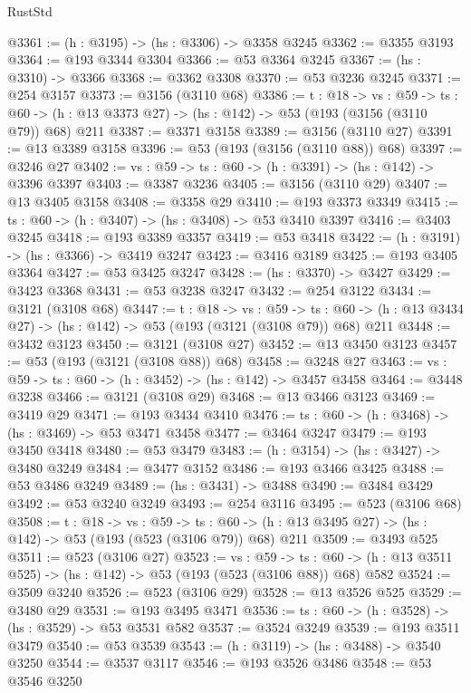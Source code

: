 \begin{lexlean}{RustStd}
\begin{coremodule}
@3361 := (h : @3195) -> (hs : @3306) -> @3358 @3245
@3362 := @3355 @3193
@3364 := @193 @3344 @3304
@3366 := @53 @3364 @3245
@3367 := (hs : @3310) -> @3366
@3368 := @3362 @3308
@3370 := @53 @3236 @3245
@3371 := @254 @3157
@3373 := @3156 (@3110 @68)
@3386 := {t : @18} ->
  {vs : @59} ->
  {ts : @60} -> (h : @13 @3373 @27) -> (hs : @142) -> @53 (@193 (@3156 (@3110 @79)) @68) @211
@3387 := @3371 @3158
@3389 := @3156 (@3110 @27)
@3391 := @13 @3389 @3158
@3396 := @53 (@193 (@3156 (@3110 @88)) @68)
@3397 := @3246 @27
@3402 := {vs : @59} -> {ts : @60} -> (h : @3391) -> (hs : @142) -> @3396 @3397
@3403 := @3387 @3236
@3405 := @3156 (@3110 @29)
@3407 := @13 @3405 @3158
@3408 := @3358 @29
@3410 := @193 @3373 @3349
@3415 := {ts : @60} -> (h : @3407) -> (hs : @3408) -> @53 @3410 @3397
@3416 := @3403 @3245
@3418 := @193 @3389 @3357
@3419 := @53 @3418
@3422 := (h : @3191) -> (hs : @3366) -> @3419 @3247
@3423 := @3416 @3189
@3425 := @193 @3405 @3364
@3427 := @53 @3425 @3247
@3428 := (hs : @3370) -> @3427
@3429 := @3423 @3368
@3431 := @53 @3238 @3247
@3432 := @254 @3122
@3434 := @3121 (@3108 @68)
@3447 := {t : @18} ->
  {vs : @59} ->
  {ts : @60} -> (h : @13 @3434 @27) -> (hs : @142) -> @53 (@193 (@3121 (@3108 @79)) @68) @211
@3448 := @3432 @3123
@3450 := @3121 (@3108 @27)
@3452 := @13 @3450 @3123
@3457 := @53 (@193 (@3121 (@3108 @88)) @68)
@3458 := @3248 @27
@3463 := {vs : @59} -> {ts : @60} -> (h : @3452) -> (hs : @142) -> @3457 @3458
@3464 := @3448 @3238
@3466 := @3121 (@3108 @29)
@3468 := @13 @3466 @3123
@3469 := @3419 @29
@3471 := @193 @3434 @3410
@3476 := {ts : @60} -> (h : @3468) -> (hs : @3469) -> @53 @3471 @3458
@3477 := @3464 @3247
@3479 := @193 @3450 @3418
@3480 := @53 @3479
@3483 := (h : @3154) -> (hs : @3427) -> @3480 @3249
@3484 := @3477 @3152
@3486 := @193 @3466 @3425
@3488 := @53 @3486 @3249
@3489 := (hs : @3431) -> @3488
@3490 := @3484 @3429
@3492 := @53 @3240 @3249
@3493 := @254 @3116
@3495 := @523 (@3106 @68)
@3508 := {t : @18} ->
  {vs : @59} ->
  {ts : @60} -> (h : @13 @3495 @27) -> (hs : @142) -> @53 (@193 (@523 (@3106 @79)) @68) @211
@3509 := @3493 @525
@3511 := @523 (@3106 @27)
@3523 := {vs : @59} ->
  {ts : @60} -> (h : @13 @3511 @525) -> (hs : @142) -> @53 (@193 (@523 (@3106 @88)) @68) @582
@3524 := @3509 @3240
@3526 := @523 (@3106 @29)
@3528 := @13 @3526 @525
@3529 := @3480 @29
@3531 := @193 @3495 @3471
@3536 := {ts : @60} -> (h : @3528) -> (hs : @3529) -> @53 @3531 @582
@3537 := @3524 @3249
@3539 := @193 @3511 @3479
@3540 := @53 @3539
@3543 := (h : @3119) -> (hs : @3488) -> @3540 @3250
@3544 := @3537 @3117
@3546 := @193 @3526 @3486
@3548 := @53 @3546 @3250

\end{coremodule}
\end{lexlean}
